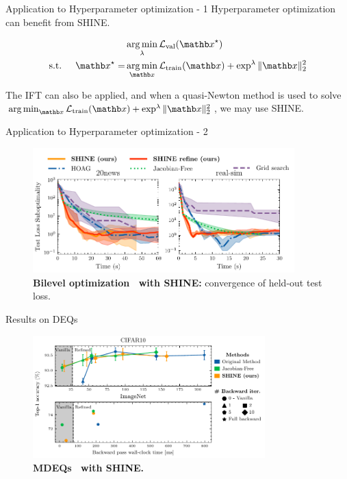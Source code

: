 \begin{frame}{Application to Hyperparameter optimization - 1}
    Hyperparameter optimization can benefit from SHINE.

    \begin{equation*}
        \begin{split}
            &\argmin_{\lambda} \mathcal{L}_{\text{val}}(\xb^\star)\\
            \text{s.t. } \quad \xb^\star = &\argmin_{\xb} \mathcal{L}_{\text{train}}(\xb) + \exp^{\lambda} \|\xb\|_2^2
        \end{split}
    \end{equation*}

    \pause
    The IFT can also be applied, and when a quasi-Newton method is used to solve $\argmin_{\xb} \mathcal{L}_{\text{train}}(\xb) + \exp^{\lambda} \|\xb\|_2^2$, we may use SHINE.
\end{frame}

\begin{frame}{Application to Hyperparameter optimization - 2}
    \begin{figure}
        \centering
        \includegraphics[width=0.9\textwidth]{Figures/shine_figures/bilevel_test.pdf}
        \caption{\textbf{Bilevel optimization~\citep{Pedregosa2016HyperparameterGradient} with SHINE:} convergence of held-out test loss.}
    \end{figure}
    
\end{frame}

\begin{frame}{Results on DEQs}
    \begin{figure}
        \centering
        \includegraphics[width=0.8\textwidth]{Figures/shine_figures/merged_results_latency_style.pdf}
        \caption{\textbf{MDEQs~\citep{Bai2020MultiscaleModels} with SHINE.}}
    \end{figure}
\end{frame}

